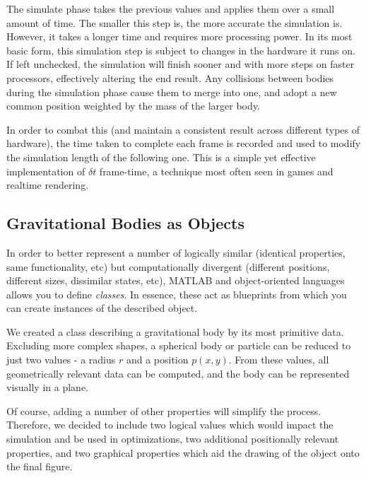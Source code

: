 \documentclass[11pt]{article}
\begin{document}
The simulate phase takes the previous values and applies them over a small amount of time. The smaller this step is, the more accurate the simulation is. However, it takes a longer time and requires more processing power. In its most basic form, this simulation step is subject to changes in the hardware it runs on. If left unchecked, the simulation will finish sooner and with more steps on faster processors, effectively altering the end result. Any collisions between bodies during the simulation phase cause them to merge into one, and adopt a new common position weighted by the mass of the larger body.

In order to combat this (and maintain a consistent result across different types of hardware), the time taken to complete each frame is recorded and used to modify the simulation length of the following one. This is a simple yet effective implementation of $\delta t$ frame-time, a technique most often seen in games and realtime rendering.


\subsection{Gravitational Bodies as Objects}
In order to better represent a number of logically similar (identical properties, same functionality, etc) but computationally divergent (different positions, different sizes, dissimilar states, etc), MATLAB and object-oriented languages allows you to define \emph{classes}. In essence, these act as blueprints from which you can create instances of the described object.

We created a class describing a gravitational body by its most primitive data. Excluding more complex shapes, a spherical body or particle can be reduced to just two values - a radius $r$ and a position $p(x, y)$. From these values, all geometrically relevant data can be computed, and the body can be represented visually in a plane.

Of course, adding a number of other properties will simplify the process. Therefore, we decided to include two logical values which would impact the simulation and be used in optimizations, two additional positionally relevant properties, and two graphical properties which aid the drawing of the object onto the final figure.
\end{document}
